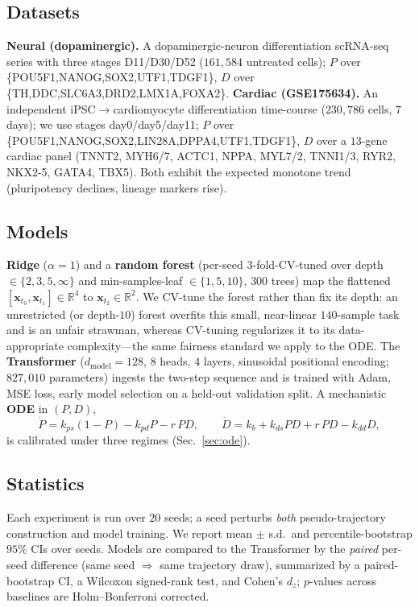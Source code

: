 \documentclass[11pt]{article}
\newcommand{\dz}{d_{z}}
\begin{document}
\subsection{Datasets}
\textbf{Neural (dopaminergic).} A dopaminergic-neuron differentiation scRNA-seq
series with three stages D11/D30/D52 ($161{,}584$ untreated cells); $P$ over
\{POU5F1,NANOG,SOX2,UTF1,TDGF1\}, $D$ over \{TH,DDC,SLC6A3,DRD2,LMX1A,FOXA2\}.
\textbf{Cardiac (GSE175634).} An independent iPSC$\rightarrow$cardiomyocyte
differentiation time-course \cite{elorbany2022} ($230{,}786$ cells, $7$ days);
we use stages day0/day5/day11; $P$ over \{POU5F1,NANOG,SOX2,LIN28A,DPPA4,UTF1,TDGF1\},
$D$ over a $13$-gene cardiac panel (TNNT2, MYH6/7, ACTC1, NPPA, MYL7/2, TNNI1/3,
RYR2, NKX2-5, GATA4, TBX5). Both exhibit the expected monotone trend (pluripotency
declines, lineage markers rise).

\subsection{Models}
\textbf{Ridge} ($\alpha=1$) and a \textbf{random forest} (per-seed $3$-fold-CV-tuned
over depth $\in\{2,3,5,\infty\}$ and min-samples-leaf $\in\{1,5,10\}$, $300$ trees)
map the flattened $[\mathbf{x}_{t_0},\mathbf{x}_{t_1}]\in\mathbb{R}^4$ to
$\mathbf{x}_{t_2}\in\mathbb{R}^2$. We CV-tune the forest rather than fix its depth:
an unrestricted (or depth-$10$) forest overfits this small, near-linear $140$-sample
task and is an unfair strawman, whereas CV-tuning regularizes it to its
data-appropriate complexity---the same fairness standard we apply to the ODE. The \textbf{Transformer}
($d_{\text{model}}=128$, $8$ heads, $4$ layers, sinusoidal positional encoding;
$827{,}010$ parameters) ingests the two-step sequence and is trained with Adam,
MSE loss, early model selection on a held-out validation split. A mechanistic
\textbf{ODE} in $(P,D)$,
\[
\dot P = k_{ps}(1-P)-k_{pd}P-r\,PD,\qquad
\dot D = k_{b}+k_{ds}PD+r\,PD-k_{dd}D,
\]
is calibrated under three regimes (Sec.~\ref{sec:ode}).

\subsection{Statistics}
Each experiment is run over $20$ seeds; a seed perturbs \emph{both}
pseudo-trajectory construction and model training. We report mean $\pm$ s.d.\ and
percentile-bootstrap $95\%$ CIs over seeds. Models are compared to the Transformer
by the \emph{paired} per-seed difference (same seed $\Rightarrow$ same trajectory
draw), summarized by a paired-bootstrap CI, a Wilcoxon signed-rank test, and
Cohen's $\dz$; $p$-values across baselines are Holm--Bonferroni corrected.
\end{document}

